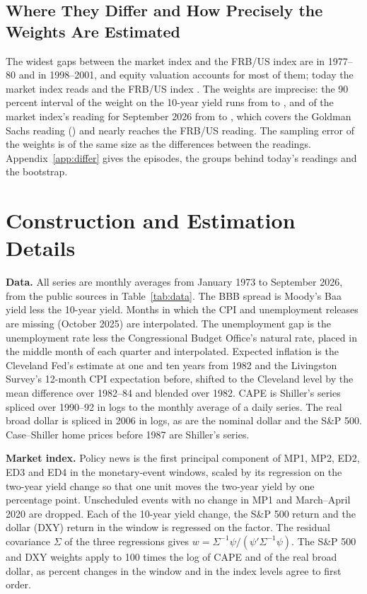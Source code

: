 \documentclass[11pt]{article}
\begin{document}
\begin{appendices}
\subsection{Where They Differ and How Precisely the Weights Are Estimated}\label{sec:wheresummary}
The widest gaps between the market index and the FRB/US index are in 1977--80 and in 1998--2001, and equity valuation accounts for most of them; today the market index reads  and the FRB/US index . The weights are imprecise: the 90 percent interval of the weight on the 10-year yield runs from  to , and of the market index's reading for September 2026 from  to , which covers the Goldman Sachs reading () and nearly reaches the FRB/US reading. The sampling error of the weights is of the same size as the differences between the readings. Appendix~\ref{app:differ} gives the episodes, the groups behind today's readings and the bootstrap.
\FloatBarrier

\section{Construction and Estimation Details}\label{app:details}
\textbf{Data.} All series are monthly averages from January 1973 to September 2026, from the public sources in Table~\ref{tab:data}. The BBB spread is Moody's Baa yield less the 10-year yield. Months in which the CPI and unemployment releases are missing (October 2025) are interpolated. The unemployment gap is the unemployment rate less the Congressional Budget Office's natural rate, placed in the middle month of each quarter and interpolated. Expected inflation is the Cleveland Fed's estimate at one and ten years from 1982 and the Livingston Survey's 12-month CPI expectation before, shifted to the Cleveland level by the mean difference over 1982--84 and blended over 1982. CAPE is Shiller's series spliced over 1990--92 in logs to the monthly average of a daily series. The real broad dollar is spliced in 2006 in logs, as are the nominal dollar and the S\&P 500. Case--Shiller home prices before 1987 are Shiller's series.

\textbf{Market index.} Policy news is the first principal component of MP1, MP2, ED2, ED3 and ED4 in the monetary-event windows, scaled by its regression on the two-year yield change so that one unit moves the two-year yield by one percentage point. Unscheduled events with no change in MP1 and March--April 2020 are dropped. Each of the 10-year yield change, the S\&P 500 return and the dollar (DXY) return in the window is regressed on the factor. The residual covariance $\Sigma$ of the three regressions gives $w=\Sigma^{-1}\psi/(\psi'\Sigma^{-1}\psi)$. The S\&P 500 and DXY weights apply to 100 times the log of CAPE and of the real broad dollar, as percent changes in the window and in the index levels agree to first order.


\end{appendices}
\end{document}
